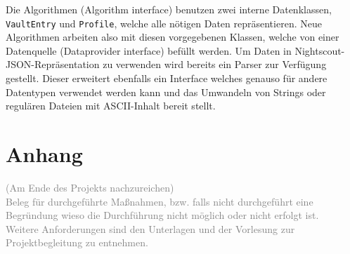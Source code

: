 \documentclass[accentcolor=tud0b,12pt,paper=a4]{tudreport}
\begin{document}
Die Algorithmen (Algorithm interface) benutzen zwei interne Datenklassen, \texttt{VaultEntry} und \texttt{Profile}, welche alle nötigen Daten repräsentieren. Neue Algorithmen arbeiten also mit diesen vorgegebenen Klassen, welche von einer Datenquelle (Dataprovider interface) befüllt werden. Um Daten in Nightscout-JSON-Repräsentation zu verwenden wird bereits ein Parser zur Verfügung gestellt. Dieser erweitert ebenfalls ein Interface welches genauso für andere Datentypen verwendet werden kann und das Umwandeln von Strings oder regulären Dateien mit ASCII-Inhalt bereit stellt.


	        
	
\appendix	
	\chapter{Anhang}
		
		\textcolor{gray}{(Am Ende des Projekts nachzureichen)}\\
		
		\textcolor{gray}{Beleg für durchgeführte Maßnahmen, bzw. falls nicht durchgeführt eine Begründung wieso die Durchführung nicht möglich oder nicht erfolgt ist. \\
		Weitere Anforderungen sind den Unterlagen und der Vorlesung zur Projektbegleitung zu entnehmen.}
	
\end{document}
